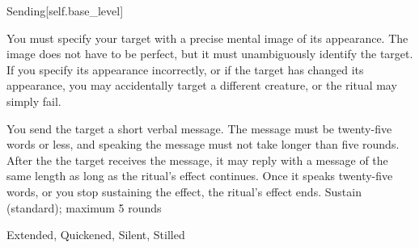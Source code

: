 \begin{spellsection}{Sending}[self.base_level]
\begin{spellcontent}
\begin{spelltargetinginfo}
\spellspecial
You must specify your target with a precise mental image of its appearance.
The image does not have to be perfect, but it must unambiguously identify the target.
If you specify its appearance incorrectly, or if the target has changed its appearance, you may accidentally target a different creature, or the ritual may simply fail.
\end{spelltargetinginfo}
\begin{spelleffects}
\spelleffect
You send the target a short verbal message.
The message must be twenty-five words or less, and speaking the message must not take longer than five rounds.
After the the target receives the message, it may reply with a message of the same length as long as the ritual's effect continues.
Once it speaks twenty-five words, or you stop sustaining the effect, the ritual's effect ends.
\spelldur Sustain (standard); maximum 5 rounds
\end{spelleffects}
\end{spellcontent}
\begin{spellfooter}
 Extended, Quickened, Silent, Stilled
\end{spellfooter}
\begin{spellsubcontent}
\end{spellsubcontent}
\end{spellsection}
